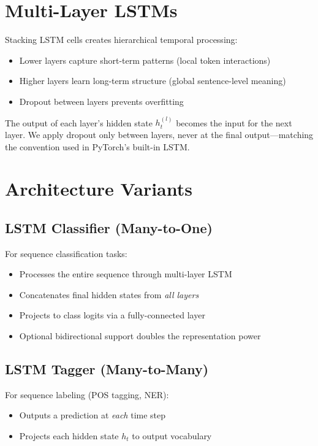 \documentclass[12pt]{article}
\begin{document}
\section*{Multi-Layer LSTMs}
Stacking LSTM cells creates hierarchical temporal processing:
\begin{itemize}
    \item Lower layers capture short-term patterns (local token interactions)
    \item Higher layers learn long-term structure (global sentence-level meaning)
    \item Dropout between layers prevents overfitting
\end{itemize}

The output of each layer's hidden state $h_t^{(l)}$ becomes the input for the next layer. We apply dropout only between layers, never at the final output---matching the convention used in PyTorch's built-in LSTM.

\section*{Architecture Variants}

\subsection*{LSTM Classifier (Many-to-One)}
For sequence classification tasks:
\begin{itemize}
    \item Processes the entire sequence through multi-layer LSTM
    \item Concatenates final hidden states from \textit{all layers}
    \item Projects to class logits via a fully-connected layer
    \item Optional bidirectional support doubles the representation power
\end{itemize}

\subsection*{LSTM Tagger (Many-to-Many)}
For sequence labeling (POS tagging, NER):
\begin{itemize}
    \item Outputs a prediction at \textit{each} time step
    \item Projects each hidden state $h_t$ to output vocabulary
\end{itemize}
\end{document}
